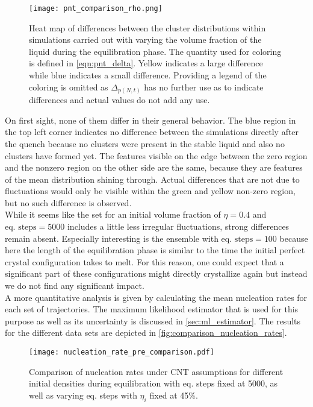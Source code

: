 \begin{figure}[h!]
\centering
\texttt{[image: pnt\_comparison\_rho.png]}
\caption[Heat maps of differences under variation of initial density]{Heat map of differences between the cluster distributions within simulations carried out with varying the volume fraction of the liquid during the equilibration phase. The quantity used for coloring is defined in \autoref{eqn:pnt_delta}. Yellow indicates a large difference while blue indicates a small difference. Providing a legend of the coloring is omitted as $\Delta_{p(N,t)}$ has no further use as to indicate differences and actual values do not add any use.}
\label{fig:pnt_rho_comparison}
\end{figure}

On first sight, none of them differ in their general behavior. The blue region in the top left corner indicates no difference between the simulations directly after the quench because no clusters were present in the stable liquid and also no clusters have formed yet. The features visible on the edge between the zero region and the nonzero region on the other side are the same, because they are features of the mean distribution shining through. Actual differences that are not due to fluctuations would only be visible within the green and yellow non-zero region, but no such difference is observed.\\

While it seems like the set for an initial volume fraction of $\eta=0.4$ and $\text{eq. steps} = 5000$ includes a little less irregular fluctuations, strong differences remain absent. Especially interesting is the ensemble with $\text{eq. steps} = 100$ because here the length of the equilibration phase is similar to the time the initial perfect crystal configuration takes to melt. For this reason, one could expect that a significant part of these configurations might directly crystallize again but instead we do not find any significant impact.\\

A more quantitative analysis is given by calculating the mean nucleation rates for each set of trajectories. The maximum likelihood estimator that is used for this purpose as well as its uncertainty is discussed in \autoref{sec:ml_estimator}. The results for the different data sets are depicted in \autoref{fig:comparison_nucleation_rates}.
\begin{figure}[h!]
\centering
\texttt{[image: nucleation\_rate\_pre\_comparison.pdf]}
\caption[Nucleation rates of equilibration test measurements]{Comparison of nucleation rates under CNT assumptions for different initial densities during equilibration with eq. steps fixed at 5000, as well as varying eq. steps with $\eta_i$ fixed at 45\%. }
\label{fig:comparison_nucleation_rates}
\end{figure}

